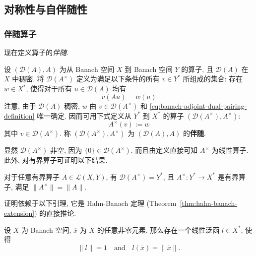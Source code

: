\subsection{对称性与自伴随性}\label{sec:symmetry-and-self-adjointness}\label{sec:adjoint-operators}

\subsubsection{伴随算子}\label{subsec:banach-adjoint-operator}

现在定义算子的\emph{伴随}.

\begin{Definition}
\label{def:banach-adjoint-operator}
设 $(\mathcal{D}(A),A)$ 为从 Banach 空间 $X$ 到 Banach 空间 $Y$ 的算子, 且 $\mathcal{D}(A)$ 在 $X$ 中稠密. 将 $\mathcal{D}(A^\times)$ 定义为满足以下条件的所有 $v\in Y^*$ 所组成的集合: 存在 $w\in X^*$, 使得对于所有 $u\in\mathcal{D}(A)$ 均有
\begin{equation}\label{eq:banach-adjoint-dual-pairing-definition}
v(Au)=w(u)
\end{equation}
注意, 由于 $\mathcal{D}(A)$ 稠密, $w$ 由 $v\in\mathcal{D}(A^\times)$ 和 \eqref{eq:banach-adjoint-dual-pairing-definition} 唯一确定. 因而可用下式定义从 $Y^*$ 到 $X^*$ 的算子 $(\mathcal{D}(A^\times),A^\times)$:
\begin{equation}\label{eq:banach-adjoint-action-definition}
A^\times(v):=w
\end{equation}
其中 $v\in\mathcal{D}(A^\times)$. 称 $(\mathcal{D}(A^\times),A^\times)$ 为 $(\mathcal{D}(A),A)$ 的\textbf{伴随}.
\end{Definition}

显然 $\mathcal{D}(A^\times)$ 非空, 因为 $\{0\}\in\mathcal{D}(A^\times)$. 而且由定义直接可知 $A^\times$ 为线性算子. 此外, 对有界算子可证明以下结果.

\begin{Theorem}
\label{thm:bounded-adjoint-domain-and-norm}
对于任意有界算子 $A\in\mathcal{L}(X,Y)$, 有 $\mathcal{D}(A^\times)=Y^*$, 且 $A^\times:Y^*\to X^*$ 是有界算子, 满足 $\|A^\times\|=\|A\|$.
\end{Theorem}

证明依赖于以下引理, 它是 Hahn-Banach 定理 (Theorem~\ref{thm:hahn-banach-extension}) 的直接推论.

\begin{Lemma}
\label{lem:unit-norm-norming-functional}
设 $X$ 为 Banach 空间, $\overline x$ 为 $X$ 的任意非零元素. 那么存在一个线性泛函 $l\in X^*$, 使得
\begin{equation}\label{eq:norming-functional-unit-norm-equality}
\|l\|=1\quad\text{and}\quad l(\overline x)=\|\overline x\|.
\end{equation}

\end{Lemma}

